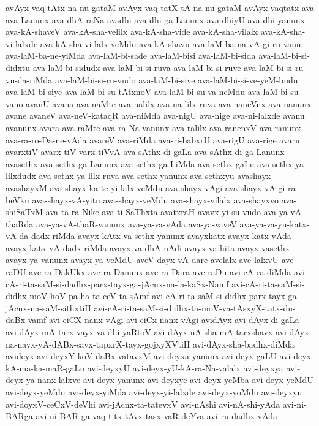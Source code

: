 {avAyx-vaq-tAtx-na-nu-gataM
avAyx-vaq-tatX-tA-na-nu-gataM
avAyx-vaqtatx
ava
ava-Lanunx
ava-dhA-raNa
avadhi
ava-dhi-ga-Lanunx
ava-dhiyU
ava-dhi-yanunx
ava-kA-shaveV
ava-kA-sha-velilx
ava-kA-sha-vide
ava-kA-sha-vilalx
ava-kA-sha-vi-lalxde
ava-kA-sha-vi-lalx-veMdu
ava-kA-shavu
ava-laM-ba-na-vA-gi-ru-vanu
ava-laM-ba-ne-yiMda
ava-laM-bi-sade
ava-laM-bisi
ava-laM-bi-sida
ava-laM-bi-si-didxtu
ava-laM-bi-sidudx
ava-laM-bi-si-ruva
ava-laM-bi-si-ruve
ava-laM-bi-si-ru-vu-da-riMda
ava-laM-bi-si-ru-vudo
ava-laM-bi-sive
ava-laM-bi-si-ve-yeM-budu
ava-laM-bi-siye
ava-laM-bi-su-tAtxnoV
ava-laM-bi-su-va-neMdu
ava-laM-bi-su-vano
avanU
avana
ava-naMte
ava-nalilx
ava-na-lilx-ruva
ava-naneVnx
ava-nanunx
avane
avaneV
ava-neV-kataqR
ava-niMda
ava-nigU
ava-nige
ava-ni-lalxde
avanu
avanunx
avara
ava-raMte
ava-ra-Na-vanunx
ava-ralilx
ava-ranenxV
ava-ranunx
ava-ra-ro-Da-ne-vAda
avareV
ava-riMda
ava-ri-babxrU
ava-rigU
ava-rige
avaru
avarxtiV
avarx-tiV-varx-tiVvA
ava-sAthx-di-gaLa
ava-sAthx-di-ga-Lanunx
avasethx
ava-sethx-ga-Lanunx
ava-sethx-ga-LiMda
ava-sethx-gaLu
ava-sethx-ya-lilxdudx
ava-sethx-ya-lilx-ruva
ava-sethx-yanunx
ava-sethxyu
avashayx
avashayxM
ava-shayx-ka-te-yi-lalx-veMdu
ava-shayx-vAgi
ava-shayx-vA-gi-ra-beVku
ava-shayx-vA-yitu
ava-shayx-veMdu
ava-shayx-vilalx
ava-shayxvo
ava-shiSaTxM
ava-ta-ra-Nike
ava-ti-SaThxta
avatxraH
avavx-yi-su-vudo
ava-ya-vA-thaRda
ava-ya-vA-thaR-vanunx
ava-ya-va-vAda
ava-ya-vaveV
ava-ya-va-yu-katx-vA-da-dadx-riMda
avayx-kAtx-va-sethx-yanunx
avayxkatx
avayx-katx-vAda
avayx-katx-vA-dadx-riMda
avayx-va-dhA-nAdi
avayx-va-hita
avayx-vasethx
avayx-ya-vanunx
avayx-ya-veMdU
aveV-dayx-vA-dare
avelalx
ave-lalxvU
ave-raDU
ave-ra-DakUkx
ave-ra-Danunx
ave-ra-Dara
ave-raDu
avi-cA-ra-diMda
avi-cA-ri-ta-saM-si-dadhx-parx-tayx-ga-jAcnx-na-la-kaSx-Namf
avi-cA-ri-ta-saM-si-didhx-moV-hoV-pa-ha-ta-ceV-ta-sAmf
avi-cA-ri-ta-saM-si-didhx-parx-tayx-ga-jAcnx-na-saM-sithxtiH
avi-cA-ri-ta-saM-si-didhx-ta-moV-va-tAsxyX-tatx-du-daBx-vamf
avi-ciCX-nanx-vAgi
avi-ciCx-nanx-vAgi
avidAyx
avi-dAyx-di-gaLa
avi-dAyx-mA-tarx-vayx-va-dhi-yaRtoV
avi-dAyx-nA-sha-mA-tarxshavx
avi-dAyx-na-navx-yA-dABx-savx-tapxrX-tayx-gojxyXVtiH
avi-dAyx-sha-badhx-diMda
avideyx
avi-deyxY-koV-daBx-vatavxM
avi-deyxa-yanunx
avi-deyx-gaLU
avi-deyx-kA-ma-ka-maR-gaLu
avi-deyxyU
avi-deyx-yU-kA-ra-Na-valalx
avi-deyxya
avi-deyx-ya-nanx-lalxve
avi-deyx-yanunx
avi-deyxye
avi-deyx-yeMba
avi-deyx-yeMdU
avi-deyx-yeMdu
avi-deyx-yiMda
avi-deyx-yi-lalxde
avi-deyx-yoMdu
avi-deyxyu
avi-doyxV-ceCxV-deVhi
avi-jAcnx-ta-tatevxV
avi-nAshi
avi-nA-shi-yAda
avi-ni-BARga
avi-ni-BAR-ga-vaq-titx-tAvx-tasx-vaR-deYva
avi-ru-dadhx-vAda
}
